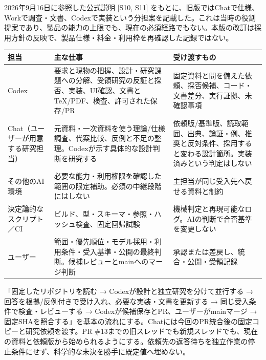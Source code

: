 \documentclass[11pt,a4paper]{article}
\newcounter{none}
\begin{document}
2026年9月16日に参照した公式説明 {[}S10, S11{]}
をもとに、旧版ではChatで仕様、Workで調査・文書、Codexで実装という分担案を記載した。これは当時の役割提案であり、製品の能力の上限でも、現在の必須経路でもない。本版の改訂は採用方針の反映で、製品仕様・料金・利用枠を再確認した記録ではない。

{\def\LTcaptype{none} %
\begin{longtable}[]{@{}
  >{\raggedright\arraybackslash}p{}
  >{\raggedright\arraybackslash}p{}
  >{\raggedright\arraybackslash}p{}@{}}
\toprule\noalign{}
\begin{minipage}[b]{\linewidth}\raggedright
担当
\end{minipage} & \begin{minipage}[b]{\linewidth}\raggedright
主な仕事
\end{minipage} & \begin{minipage}[b]{\linewidth}\raggedright
受け渡すもの
\end{minipage} \\
\midrule\noalign{}
\endhead
\bottomrule\noalign{}
\endlastfoot
Codex &
要求と現物の把握、設計・研究課題への分解、受領研究の反証と採否、実装、UI確認、文書とTeX/PDF、検査、許可された保存/PR
&
固定資料と問を備えた依頼、採否候補、コード・文書差分、実行証拠、未確認事項 \\
Chat（ユーザーが用意する研究担当） &
元資料・一次資料を使う理論/仕様調査、代案比較、反例と不足の整理。Codexが示す具体的な設計判断を研究する
&
依頼版/基準版、読取範囲、出典、論証・例、推奨と反対条件、採用すると変わる設計箇所。実装済みという判定はしない \\
その他のAI環境 &
必要な能力・利用権限を確認した範囲の限定補助。必須の中継段階にはしない &
主担当が同じ受入先へ戻せる資料と制約 \\
決定論的なスクリプト／CI &
ビルド、型・スキーマ・参照・ハッシュ検査、固定回帰試験 &
機械判定と再現可能なログ。AIの判断で合否基準を変更しない \\
ユーザー &
範囲・優先順位・モデル採用・利用条件・受入基準・公開の最終判断。候補レビューとmainへのマージ判断
& 承認または差戻し、統合・公開・受領記録 \\
\end{longtable}
}

「固定したリポジトリを読む → Codexが設計と独立研究を分けて並行する →
回答を根拠/反例付きで受け入れ、必要な実装・文書を更新する →
同じ受入条件で検査・レビューする →
Codexが候補保存とPR、ユーザーがmainマージ →
固定SHAを照合する」を基本の流れにする。Chatには今回のPR統合後の固定コピーと研究依頼を渡す。PR
\#13までの旧スレッドでも新規スレッドでも、現在の資料と依頼版から始められるようにする。依頼先の返答待ちを独立作業の停止条件にせず、科学的な未決を勝手に既定値へ埋めない。
\end{document}

